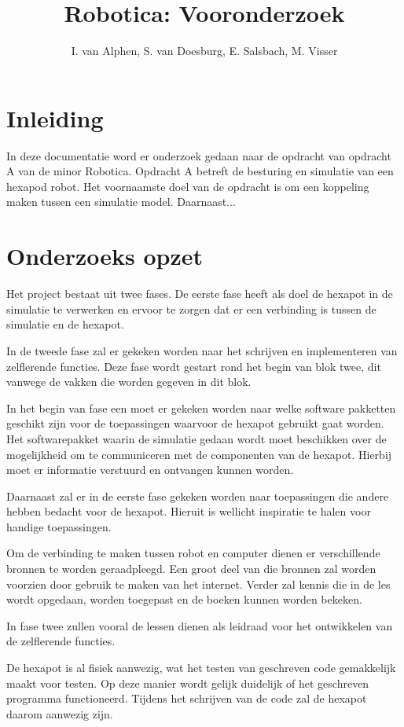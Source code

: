 \documentclass[10pt,a4paper]{article}
\title{Robotica: Vooronderzoek}
\author{I. van Alphen, S. van Doesburg, E.  Salsbach, M. Visser}
\begin{document}
\maketitle

\section{Inleiding}
In deze documentatie word er onderzoek gedaan naar de opdracht van opdracht A van de minor Robotica. Opdracht A betreft de besturing en simulatie van een hexapod robot. Het voornaamste doel van de opdracht is om een koppeling maken tussen een simulatie model. Daarnaast...

\section{Onderzoeks opzet}
Het project bestaat uit twee fases. De eerste fase heeft als doel de hexapot in de simulatie te verwerken en ervoor te zorgen dat er een verbinding is tussen de simulatie en de hexapot. 

In de tweede fase zal er gekeken worden naar het schrijven en implementeren van zelflerende functies. Deze fase wordt gestart rond het begin van blok twee, dit vanwege de vakken die worden gegeven in dit blok.

In het begin van fase een moet er gekeken worden naar welke software pakketten geschikt zijn voor de toepassingen waarvoor de hexapot gebruikt gaat worden. Het softwarepakket waarin de simulatie gedaan wordt moet beschikken over de mogelijkheid om te communiceren met de componenten van de hexapot. Hierbij moet er informatie verstuurd en ontvangen kunnen worden.

Daarnaast zal er in de eerste fase gekeken worden naar toepassingen die andere hebben bedacht voor de hexapot. Hieruit is wellicht inspiratie te halen voor handige toepassingen.

Om de verbinding te maken tussen robot en computer dienen er verschillende bronnen te worden geraadpleegd. Een groot deel van die bronnen zal worden voorzien door gebruik te maken van het internet. Verder zal kennis die in de les wordt opgedaan, worden toegepast en de boeken kunnen worden bekeken.

In fase twee zullen vooral de lessen dienen als leidraad voor het ontwikkelen van de zelflerende functies.

De hexapot is al fisiek aanwezig, wat het testen van geschreven code gemakkelijk maakt voor testen. Op deze manier wordt gelijk duidelijk of het geschreven programma functioneerd. Tijdens het schrijven van de  code zal de hexapot daarom aanwezig zijn.
\end{document}

